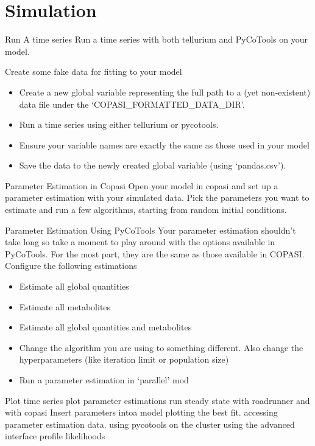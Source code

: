 \documentclass[../../main]{subfiles}
\begin{document}
\section{Simulation}

\begin{Task}[label=TimeSeries]{Run A time series}
Run a time series with both tellurium and PyCoTools on your model.
\end{Task}

\begin{Task}[label=CreateFakeData]{Create some fake data for fitting to your model}
    \begin{itemize}
        \item Create a new global variable representing the full path to a (yet non-existent) data file under the `COPASI\_FORMATTED\_DATA\_DIR'.
        \item Run a time series using either tellurium or pycotools.
        \item Ensure your variable names are exactly the same as those used in your model
        \item Save the data to the newly created global variable (using `pandas.csv').
    \end{itemize}
\end{Task}

\begin{Task}[label=ManualParameterEstimation]{Parameter Estimation in Copasi}
    Open your model in copasi and set up a parameter estimation with your simulated data. Pick the
    parameters you want to estimate and run a few algorithms, starting from random initial conditions.
\end{Task}

\begin{Task}[label=AutoParameterEstimation]{Parameter Estimation Using PyCoTools}
    Your parameter estimation shouldn't take long so take a moment to
    play around with the options available in PyCoTools. For the most part, they are the same as those available in COPASI.
    Configure the following estimations
    \begin{itemize}
        \item Estimate all global quantities
        \item Estimate all metabolites
        \item Estimate all global quantities and metabolites
        \item Change the algorithm you are using to something different. Also change the hyperparameters (like iteration limit or population size)
        \item Run a parameter estimation in `parallel' mod
    \end{itemize}
\end{Task}

    Plot time series
    plot parameter estimations
    run steady state with roadrunner and with copasi
    Insert parameters intoa model
    plotting the best fit.
    accessing parameter estimation data.
    using pycotools on the cluster
    using the advanced interface
    profile likelihoods
\end{document}
